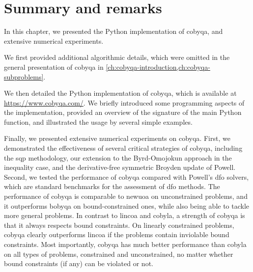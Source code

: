 
\section{Summary and remarks}

In this chapter, we presented the Python implementation of \gls{cobyqa}, and extensive numerical experiments.

We first provided additional algorithmic details, which were omitted in the general presentation of \gls{cobyqa} in \cref{ch:cobyqa-introduction,ch:cobyqa-subproblems}.

We then detailed the Python implementation of \gls{cobyqa}, which is available at \url{https://www.cobyqa.com/}.
We briefly introduced some programming aspects of the implementation, provided an overview of the signature of the main Python function, and illustrated the usage by several simple examples.

Finally, we presented extensive numerical experiments on \gls{cobyqa}.
First, we demonstrated the effectiveness of several critical strategies of \gls{cobyqa}, including the \gls{sqp} methodology, our extension to the Byrd-Omojokun approach in the inequality case, and the derivative-free symmetric Broyden update of Powell.
Second, we tested the performance of \gls{cobyqa} compared with Powell's \gls{dfo} solvers, which are standard benchmarks for the assessment of \gls{dfo} methods.
The performance of \gls{cobyqa} is comparable to \gls{newuoa} on unconstrained problems, and it outperforms \gls{bobyqa} on bound-constrained ones, while also being able to tackle more general problems.
In contrast to \gls{lincoa} and \gls{cobyla}, a strength of \gls{cobyqa} is that it always respects bound constraints.
On linearly constrained problems, \gls{cobyqa} clearly outperforms \gls{lincoa} if the problems contain inviolable bound constraints.
Most importantly, \gls{cobyqa} has much better performance than \gls{cobyla} on all types of problems, constrained and unconstrained, no matter whether bound constraints (if any) can be violated or not.

